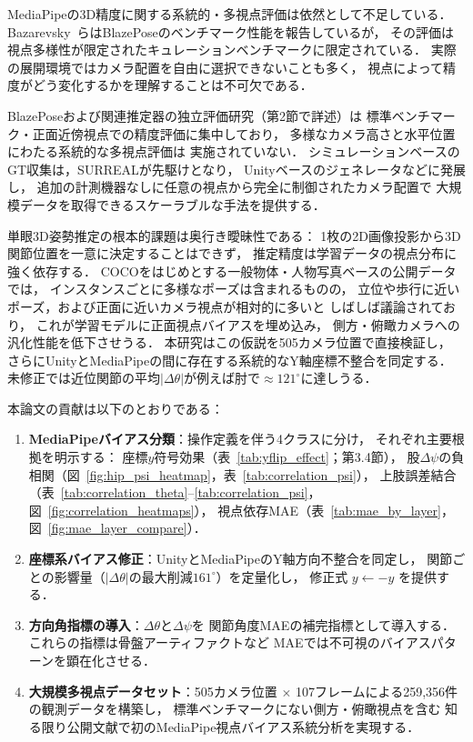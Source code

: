\documentclass[fleqn]{ieej}
\begin{document}
MediaPipeの3D精度に関する系統的・多視点評価は依然として不足している．
Bazarevsky~ら\cite{blazepose}はBlazePoseのベンチマーク性能を報告しているが，
その評価は視点多様性が限定されたキュレーションベンチマークに限定されている．
実際の展開環境ではカメラ配置を自由に選択できないことも多く，
視点によって精度がどう変化するかを理解することは不可欠である．

BlazePoseおよび関連推定器の独立評価研究（第2節で詳述）は
標準ベンチマーク・正面近傍視点での精度評価に集中しており，
多様なカメラ高さと水平位置にわたる系統的な多視点評価は
実施されていない．
シミュレーションベースのGT収集は，SURREAL\cite{surreal}が先駆けとなり，
Unityベースのジェネレータ\cite{peoplesanspeople}などに発展し，
追加の計測機器なしに任意の視点から完全に制御されたカメラ配置で
大規模データを取得できるスケーラブルな手法を提供する．

単眼3D姿勢推定の根本的課題は奥行き曖昧性である：
1枚の2D画像投影から3D関節位置を一意に決定することはできず，
推定精度は学習データの視点分布に強く依存する\cite{mehta2017}．
COCO\cite{coco}をはじめとする一般物体・人物写真ベースの公開データでは，
インスタンスごとに多様なポーズは含まれるものの，
立位や歩行に近いポーズ，および正面に近いカメラ視点が相対的に多いと
しばしば議論されており，
これが学習モデルに正面視点バイアスを埋め込み，
側方・俯瞰カメラへの汎化性能を低下させうる．
本研究はこの仮説を505カメラ位置で直接検証し，
さらにUnityとMediaPipeの間に存在する系統的なY軸座標不整合を同定する．
未修正では近位関節の平均$|\Delta\theta|$が例えば肘で$\approx121^{\circ}$に達しうる．

本論文の貢献は以下のとおりである：
\begin{enumerate}\itemsep0pt
  \item \textbf{MediaPipeバイアス分類}：操作定義を伴う4クラスに分け，
        それぞれ主要根拠を明示する：
        座標$y$符号効果（表~\ref{tab:yflip_effect}；第3.4節），
        股$\Delta\psi$の負相関（図~\ref{fig:hip_psi_heatmap}，表~\ref{tab:correlation_psi}），
        上肢誤差結合（表~\ref{tab:correlation_theta}--\ref{tab:correlation_psi}，
        図~\ref{fig:correlation_heatmaps}），
        視点依存MAE（表~\ref{tab:mae_by_layer}，図~\ref{fig:mae_layer_compare}）．
  \item \textbf{座標系バイアス修正}：UnityとMediaPipeのY軸方向不整合を同定し，
        関節ごとの影響量（$|\Delta\theta|$の最大削減$161^{\circ}$）を定量化し，
        修正式 $y \leftarrow -y$ を提供する．
  \item \textbf{方向角指標の導入}：$\Delta\theta$と$\Delta\psi$を
        関節角度MAEの補完指標として導入する．
        これらの指標は骨盤アーティファクトなど
        MAEでは不可視のバイアスパターンを顕在化させる．
  \item \textbf{大規模多視点データセット}：505カメラ位置 $\times$
        107フレームによる259,356件の観測データを構築し，
        標準ベンチマークにない側方・俯瞰視点を含む
        知る限り公開文献で初のMediaPipe視点バイアス系統分析を実現する．
\end{enumerate}
\end{document}
